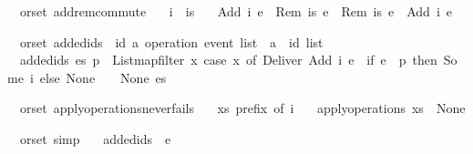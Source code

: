 \begin{isabellebody}
\isamarkupfalse%
\ {\isacharparenleft}\ orset{\isacharparenright}\ add{\isacharunderscore}rem{\isacharunderscore}commute{\isacharcolon}\isanewline
\ \ \ {\isachardoublequoteopen}i\ {\isasymnotin}\ is{\isachardoublequoteclose}\isanewline
\ \ \ {\isachardoublequoteopen}{\isasymlangle}Add\ i\ e{}{\isasymrangle}\ {\isasymrhd}\ {\isasymlangle}Rem\ is\ e{}{\isasymrangle}\ {\isacharequal}\ {\isasymlangle}Rem\ is\ e{}{\isasymrangle}\ {\isasymrhd}\ {\isasymlangle}Add\ i\ e{}{\isasymrangle}{\isachardoublequoteclose}\isanewline
\end{isabellebody}

\begin{isabellebody}
\isamarkupfalse%
\ {\isacharparenleft}\ orset{\isacharparenright}\ added{\isacharunderscore}ids\ {\isacharcolon}{\isacharcolon}\ {\isachardoublequoteopen}{\isacharparenleft}{\isacharprime}id{\isacharcomma}\ {\isacharprime}a{\isacharparenright}\ operation\ event\ list\ {\isasymRightarrow}\ {\isacharprime}a\ {\isasymRightarrow}\ {\isacharprime}id\ list{\isachardoublequoteclose}\ \isanewline
\ \ {\isachardoublequoteopen}added{\isacharunderscore}ids\ es\ p\ {\isasymequiv}\ List{\isachardot}map{\isacharunderscore}filter\ {\isacharparenleft}{\isasymlambda}x{\isachardot}\ case\ x\ of\ Deliver\ {\isacharparenleft}Add\ i\ e{\isacharparenright}\ {\isasymRightarrow}\ if\ e\ {\isacharequal}\ p\ then\ Some\ i\ else\ None\ {\isacharbar}\ {\isacharunderscore}\ {\isasymRightarrow}\ None{\isacharparenright}\ es{\isachardoublequoteclose}\isanewline
\end{isabellebody}

\begin{isabellebody}
\isamarkupfalse%
\ {\isacharparenleft}\ orset{\isacharparenright}\ apply{\isacharunderscore}operations{\isacharunderscore}never{\isacharunderscore}fails{\isacharcolon}\isanewline
\ \ \ {\isachardoublequoteopen}xs\ prefix\ of\ i{\isachardoublequoteclose}\isanewline
\ \ \ {\isachardoublequoteopen}apply{\isacharunderscore}operations\ xs\ {\isasymnoteq}\ None{\isachardoublequoteclose}\isanewline
\end{isabellebody}

\begin{isabellebody}
\isamarkupfalse%
\ {\isacharparenleft}\ orset{\isacharparenright}\ {\isacharbrackleft}simp{\isacharbrackright}{\isacharcolon}\isanewline
\ \ \ {\isachardoublequoteopen}added{\isacharunderscore}ids\ {\isacharbrackleft}{\isacharbrackright}\ e\ {\isacharequal}\ {\isacharbrackleft}{\isacharbrackright}{\isachardoublequoteclose}\isanewline
\end{isabellebody}

